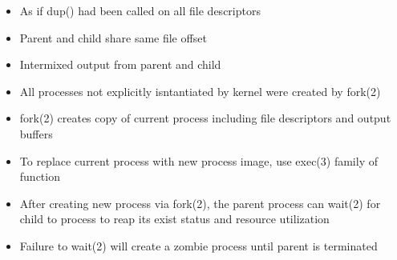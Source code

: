 \documentclass[10pt]{article}
\begin{document}
\begin{multicols}{2}
\begin{minipage}{\columnwidth}
\begin{itemize}
            \item As if dup() had been called on all file descriptors
            \item Parent and child share same file offset
            \item Intermixed output from parent and child
        \end{itemize}
        \begin{itemize}
            \item All processes not explicitly isntantiated by kernel were created by fork(2)
            \item fork(2) creates copy of current process including file descriptors and output buffers
            \item To replace current process with new process image, use exec(3) family of function
            \item After creating new process via fork(2), the parent process can wait(2) for child to process to reap its exist status and resource utilization
            \item Failure to wait(2) will create a zombie process until parent is terminated
        \end{itemize}
    \end{minipage}
\end{multicols}
\end{document}
